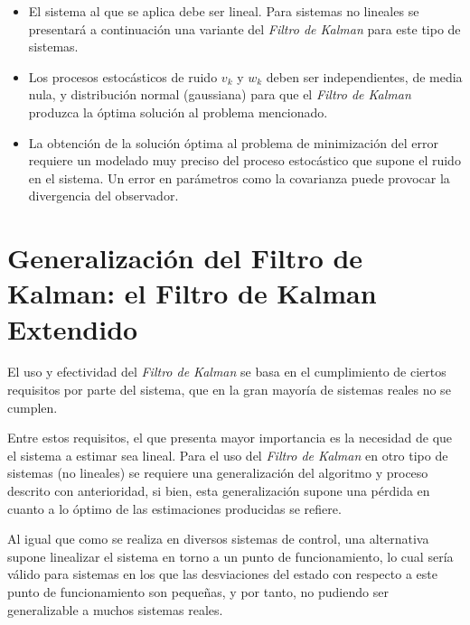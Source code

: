 \begin{itemize}

\item El sistema al que se aplica debe ser lineal. Para sistemas no lineales se presentará a continuación una variante del \emph{Filtro de Kalman} para este tipo de sistemas. \par 

\item Los procesos estocásticos de ruido $v_k$ y $w_k$ deben ser independientes, de media nula, y distribución normal (gaussiana) para que el \emph{Filtro de Kalman} produzca la óptima solución al problema mencionado. \par 

\item La obtención de la solución óptima al problema de minimización del error requiere un modelado muy preciso del proceso estocástico que supone el ruido en el sistema. Un error en parámetros como la covarianza puede provocar la divergencia del observador. \par 

\end{itemize}

\section[Filtro de Kalman Extendido]{Generalización del Filtro de Kalman: el Filtro de Kalman Extendido}

El uso y efectividad del \emph{Filtro de Kalman} se basa en el cumplimiento de ciertos requisitos por parte del sistema, que en la gran mayoría de sistemas reales no se cumplen. \par 

Entre estos requisitos, el que presenta mayor importancia es la necesidad de que el sistema a estimar sea lineal. Para el uso del \emph{Filtro de Kalman} en otro tipo de sistemas (no lineales) se requiere una generalización del algoritmo y proceso descrito con anterioridad, si bien, esta generalización supone una pérdida en cuanto a lo óptimo de las estimaciones producidas se refiere. \par 

Al igual que como se realiza en diversos sistemas de control, una alternativa supone linealizar el sistema en torno a un punto de funcionamiento, lo cual sería válido para sistemas en los que las desviaciones del estado con respecto a este punto de funcionamiento son pequeñas, y por tanto, no pudiendo ser generalizable a muchos sistemas reales. \par 

